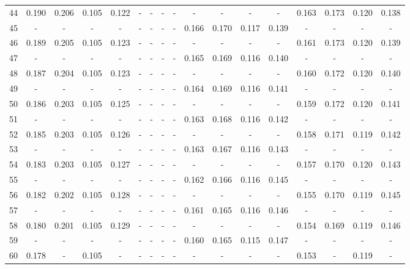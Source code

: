 \documentclass{report}
\begin{document}
\begin{appendices}
\begin{sidewaystable}
\begin{tabular}{|c|cccc|cccc|cccc|cccc|}
44 & 0.190 & 0.206 & 0.105 & 0.122 &   -   &   -   &   -   &   -   &   -   &   -   &   -   &   -   & 0.163 & 0.173 & 0.120 & 0.138\\
45 &   -   &   -   &   -   &   -   &   -   &   -   &   -   &   -   & 0.166 & 0.170 & 0.117 & 0.139 &   -   &   -   &   -   &   -  \\
46 & 0.189 & 0.205 & 0.105 & 0.123 &   -   &   -   &   -   &   -   &   -   &   -   &   -   &   -   & 0.161 & 0.173 & 0.120 & 0.139\\
47 &   -   &   -   &   -   &   -   &   -   &   -   &   -   &   -   & 0.165 & 0.169 & 0.116 & 0.140 &   -   &   -   &   -   &   -  \\
48 & 0.187 & 0.204 & 0.105 & 0.123 &   -   &   -   &   -   &   -   &   -   &   -   &   -   &   -   & 0.160 & 0.172 & 0.120 & 0.140\\
49 &   -   &   -   &   -   &   -   &   -   &   -   &   -   &   -   & 0.164 & 0.169 & 0.116 & 0.141 &   -   &   -   &   -   &   -  \\
50 & 0.186 & 0.203 & 0.105 & 0.125 &   -   &   -   &   -   &   -   &   -   &   -   &   -   &   -   & 0.159 & 0.172 & 0.120 & 0.141\\
51 &   -   &   -   &   -   &   -   &   -   &   -   &   -   &   -   & 0.163 & 0.168 & 0.116 & 0.142 &   -   &   -   &   -   &   -  \\
52 & 0.185 & 0.203 & 0.105 & 0.126 &   -   &   -   &   -   &   -   &   -   &   -   &   -   &   -   & 0.158 & 0.171 & 0.119 & 0.142\\
53 &   -   &   -   &   -   &   -   &   -   &   -   &   -   &   -   & 0.163 & 0.167 & 0.116 & 0.143 &   -   &   -   &   -   &   -  \\
54 & 0.183 & 0.203 & 0.105 & 0.127 &   -   &   -   &   -   &   -   &   -   &   -   &   -   &   -   & 0.157 & 0.170 & 0.120 & 0.143\\
55 &   -   &   -   &   -   &   -   &   -   &   -   &   -   &   -   & 0.162 & 0.166 & 0.116 & 0.145 &   -   &   -   &   -   &   -  \\
56 & 0.182 & 0.202 & 0.105 & 0.128 &   -   &   -   &   -   &   -   &   -   &   -   &   -   &   -   & 0.155 & 0.170 & 0.119 & 0.145\\
57 &   -   &   -   &   -   &   -   &   -   &   -   &   -   &   -   & 0.161 & 0.165 & 0.116 & 0.146 &   -   &   -   &   -   &   -  \\
58 & 0.180 & 0.201 & 0.105 & 0.129 &   -   &   -   &   -   &   -   &   -   &   -   &   -   &   -   & 0.154 & 0.169 & 0.119 & 0.146\\
59 &   -   &   -   &   -   &   -   &   -   &   -   &   -   &   -   & 0.160 & 0.165 & 0.115 & 0.147 &   -   &   -   &   -   &   -  \\
60 & 0.178 &   -   & 0.105 &   -   &   -   &   -   &   -   &   -   &   -   &   -   &   -   &   -   & 0.153 &   -   & 0.119 &   -  \\
\hline
\end{tabular}
\end{sidewaystable}


\end{appendices}
\end{document}
